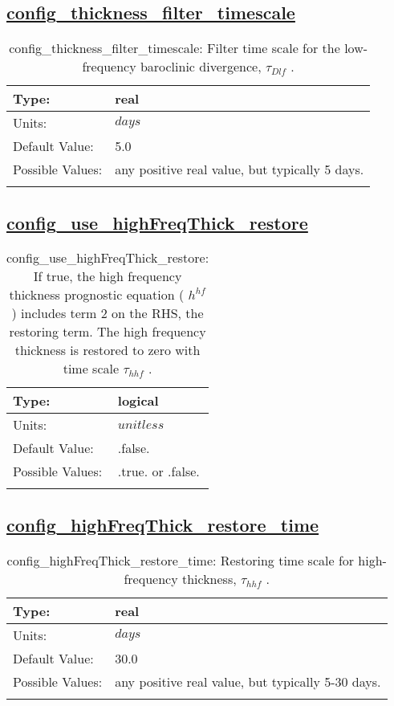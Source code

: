 \subsection[config\_thickness\_filter\_timescale]{\hyperref[sec:nm_tab_ALE_frequency_filtered_thickness]{config\_thickness\_filter\_timescale}}
\label{subsec:nm_sec_config_thickness_filter_timescale}
\begin{center}
\begin{longtable}{| p{2.0in} || p{4.0in} |}
    \hline
    Type: & real \\
    \hline
    Units: & $days$ \\
    \hline
    Default Value: & 5.0 \\
    \hline
    Possible Values: & any positive real value, but typically 5 days. \\
    \hline
    \caption{config\_thickness\_filter\_timescale:  Filter time scale for the low-frequency baroclinic divergence,  $\tau_{Dlf}$ .}
\end{longtable}
\end{center}
\subsection[config\_use\_highFreqThick\_restore]{\hyperref[sec:nm_tab_ALE_frequency_filtered_thickness]{config\_use\_highFreqThick\_restore}}
\label{subsec:nm_sec_config_use_highFreqThick_restore}
\begin{center}
\begin{longtable}{| p{2.0in} || p{4.0in} |}
    \hline
    Type: & logical \\
    \hline
    Units: & $unitless$ \\
    \hline
    Default Value: & .false. \\
    \hline
    Possible Values: & .true. or .false. \\
    \hline
    \caption{config\_use\_highFreqThick\_restore:  If true, the high frequency thickness prognostic equation ( $h^{hf}$ ) includes term 2 on the RHS, the restoring term.  The high frequency thickness is restored to zero with time scale  $\tau_{hhf}$ .}
\end{longtable}
\end{center}
\subsection[config\_highFreqThick\_restore\_time]{\hyperref[sec:nm_tab_ALE_frequency_filtered_thickness]{config\_highFreqThick\_restore\_time}}
\label{subsec:nm_sec_config_highFreqThick_restore_time}
\begin{center}
\begin{longtable}{| p{2.0in} || p{4.0in} |}
    \hline
    Type: & real \\
    \hline
    Units: & $days$ \\
    \hline
    Default Value: & 30.0 \\
    \hline
    Possible Values: & any positive real value, but typically 5-30 days. \\
    \hline
    \caption{config\_highFreqThick\_restore\_time:  Restoring time scale for high-frequency thickness,  $\tau_{hhf}$ .}
\end{longtable}
\end{center}
